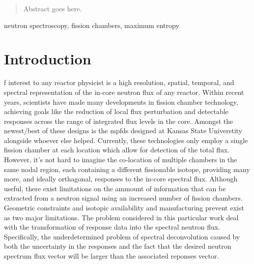 \documentclass[journal]{IEEEtran}
\begin{document}




\maketitle

\begin{abstract}
Abstract goes here.
\end{abstract}

\begin{IEEEkeywords}
neutron spectroscopy, fission chambers, maximum entropy
\end{IEEEkeywords}






%
\IEEEpeerreviewmaketitle


\section{Introduction}

f interest to any reactor physicist is a high resolution, spatial, temporal, and spectral representation of the in-core neutron flux of any reactor.
Within recent years, scientists have made many developments in fission chamber technology, achieving goals like the reduction of local flux perturbation and detectable responses across the range of integrated flux levels in the core.
Amongst the newest/best of these designs is the mpfds designed at Kansas State Universtity alongside whoever else helped.
Currently, these technologies only employ a single fission chamber at each location which allow for detection of the total flux.
However, it's not hard to imagine the co-location of multiple chambers in the same nodal region, each containing a different fissionable isotope, providing many more, and ideally orthagonal, responses to the in-core spectral flux.
Although useful, there exist limitations on the ammount of information that can be extracted from a neutron signal using an increased number of fission chambers.
Geometric constraints and isotopic availability and manufacturing prevent exist as two major limitations.
The problem considered in this particular work deal with the transformation of response data into the spectral neutron flux.
Specifically, the underdetermined problem of spectral deconvolution caused by both the uncertainty in the responses and the fact that the desired neutron spectrum flux vector will be larger than the associated reponses vector.
\end{document}
